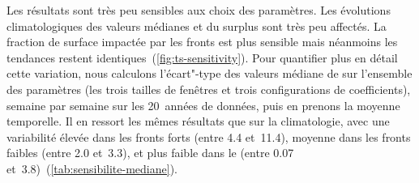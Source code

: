 \begin{table}
  \centering
  \begin{siunitText}
  \end{siunitText}
  \caption[]{%
    Coefficients de normalisation pour les différents paramètres utilisés.
  }
  \label{tab:coefs}
\end{table}

Les résultats sont très peu sensibles aux choix des paramètres.
Les évolutions climatologiques des valeurs médianes et du surplus sont très peu affectés. La fraction de surface impactée par les fronts est plus sensible mais néanmoins les tendances restent identiques~(\cref{fig:ts-sensitivity}).
Pour quantifier plus en détail cette variation, nous calculons l'écart"-type des valeurs médiane de  sur l'ensemble des paramètres (les trois tailles de fenêtres et trois configurations de coefficients), semaine par semaine sur les 20~années de données, puis en prenons la moyenne temporelle.
Il en ressort les mêmes résultats que sur la climatologie, avec une variabilité élevée dans les fronts forts (entre \qty{4.4}{\mugm} et~\qty{11.4}{\mugm}), moyenne dans les fronts faibles (entre \qty{2.0}{\mugm} et~\qty{3.3}{\mugm}), et plus faible dans le  (entre \qty{0.07}{\mugm} et~\qty{3.8}{\mugm})~(\cref{tab:sensibilite-mediane}).

